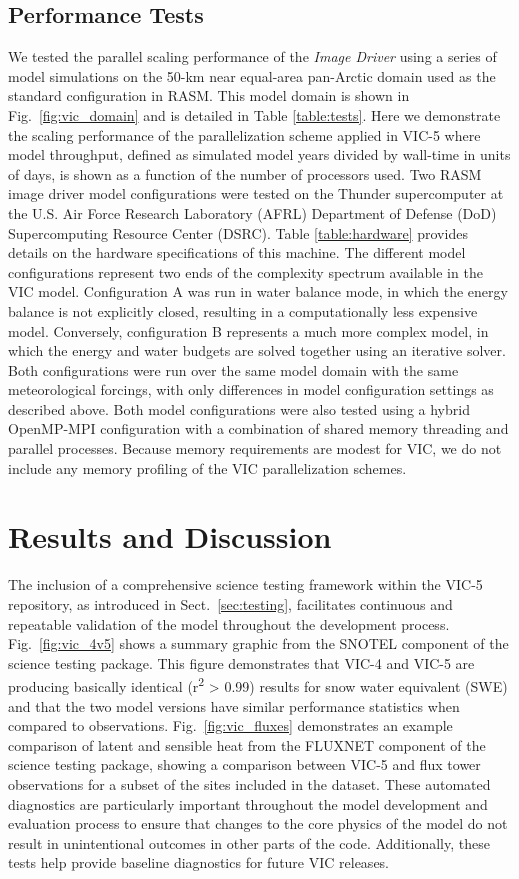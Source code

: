 \documentclass[gmd, manuscript]{copernicus}
\begin{document}
    \subsection{Performance Tests}

    We tested the parallel scaling performance of the \textit{Image Driver} using a series of model simulations on the 50-km near equal-area pan-Arctic domain used as the standard configuration in RASM. This model domain is shown in Fig.~\ref{fig:vic_domain} and is detailed in Table \ref{table:tests}. Here we demonstrate the scaling performance of the parallelization scheme applied in VIC-5 where model throughput, defined as simulated model years divided by wall-time in units of days, is shown as a function of the number of processors used. Two RASM image driver model configurations were tested on the Thunder supercomputer at the U.S. Air Force Research Laboratory (AFRL) Department of Defense (DoD) Supercomputing Resource Center (DSRC). Table \ref{table:hardware} provides details on the hardware specifications of this machine. The different model configurations represent two ends of the complexity spectrum available in the VIC model. Configuration A was run in water balance mode, in which the energy balance is not explicitly closed, resulting in a computationally less expensive model. Conversely, configuration B represents a much more complex model, in which the energy and water budgets are solved together using an iterative solver. Both configurations were run over the same model domain with the same meteorological forcings, with only differences in model configuration settings as described above. Both model configurations were also tested using a hybrid OpenMP-MPI configuration with a combination of shared memory threading and parallel processes. Because memory requirements are modest for VIC, we do not include any memory profiling of the VIC parallelization schemes.

\section{Results and Discussion}
  \label{sec:results}
  The inclusion of a comprehensive science testing framework within the VIC-5 repository, as introduced in Sect.~\ref{sec:testing}, facilitates continuous and repeatable validation of the model throughout the development process. Fig.~\ref{fig:vic_4v5} shows a summary graphic from the SNOTEL component of the science testing package. This figure demonstrates that VIC-4 and VIC-5 are producing basically identical (r\textsuperscript{2} > 0.99) results for snow water equivalent (SWE) and that the two model versions have similar performance statistics when compared to observations. Fig.~\ref{fig:vic_fluxes} demonstrates an example comparison of latent and sensible heat from the FLUXNET component of the science testing package, showing a comparison between VIC-5 and flux tower observations for a subset of the sites included in the dataset. These automated diagnostics are particularly important throughout the model development and evaluation process to ensure that changes to the core physics of the model do not result in unintentional outcomes in other parts of the code. Additionally, these tests help provide baseline diagnostics for future VIC releases.
\end{document}
